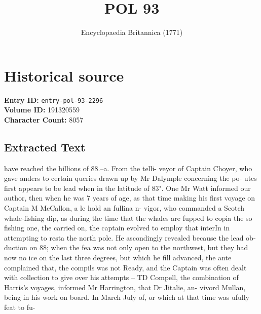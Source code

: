 \documentclass{article}
\title{POL  93}
\date{Encyclopaedia Britannica (1771)}
\begin{document}
\maketitle

\section*{Historical source}
\textbf{Entry ID:} \texttt{entry-pol-93-2296} \\
\textbf{Volume ID:} 191320559 \\
\textbf{Character Count:} 8057

\subsection*{Extracted Text}
have reached the billions of 88.--a. From the telli-
veyor of Captain Choyer, who gave anders to certain
queries drawn up by Mr Dalymple concerning the po-
utes first appears to be lead when in the latitude of 83". One Mr Watt informed our author, then when he was 7 years of age, as that time making his first voyage on Captain M McCallon, a le hold an fullina n-
vigor, who commanded a Scotch whale-fishing dip, as during the time that the whales are fupped to copia the so fishing one, the carried on, the captain evolved to employ that interIn in attempting to resta the north pole. He ascondingly revealed because the lead ob-
duction on 88; when the fea was not only open to the northwest, but they had now no ice on the last three degrees, but which he fill advanced, the ante complained that, the compils was not Ready, and the Captain was often dealt with collection to give over his attempts – TD Compell, the combination of Harris’s voyages, informed Mr Harrington, that Dr Jitalie, an-
vivord Mullan, being in his work on board. In March
July of, or which at that time was ufully feat to fu-
\end{document}

